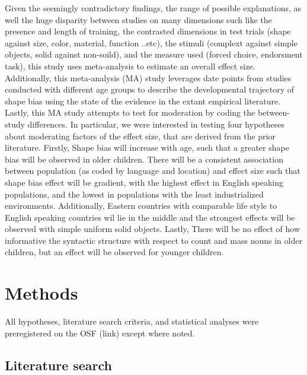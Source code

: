 \documentclass[
  man]{apa6}
\begin{document}
Given the seemingly contradictory findings, the range of possible explanations, as well the huge disparity between studies on many dimensions such like the presence and length of training, the contrasted dimensions in test trials (shape against size, color, material, function ..etc), the stimuli (complext against simple objects, solid against non-soild), and the measure used (forced choice, endorsment task), this study uses meta-analysis to estimate an overall effect size. Additionally, this meta-analysis (MA) study leverages date points from studies conducted with different age groups to describe the developmental trajectory of shape bias using the state of the evidence in the extant empirical literature. Lastly, this MA study attempts to test for moderation by coding the between-study differences.
In particular, we were interested in testing four hypotheses about moderating factors of the effect size, that are derived from the prior literature. Firstly, Shape bias will increase with age, such that a greater shape bias will be observed in older children. There will be a consistent association between population (as coded by language and location) and effect size such that shape bias effect will be gradient, with the highest effect in English speaking populations, and the lowest in populations with the least industrialized environments. Additionally, Eastern countries with comparable life style to English speaking countries wil lie in the middle and the strongest effects will be observed with simple uniform solid objects. Lastly, There will be no effect of how informative the syntactic structure with respect to count and mass nouns in older children, but an effect will be observed for younger children.

\hypertarget{methods}{%
\section{Methods}\label{methods}}

All hypotheses, literature search criteria, and statistical analyses were preregistered on the OSF (link) except where noted.

\hypertarget{literature-search}{%
\subsection{Literature search}\label{literature-search}}
\end{document}
